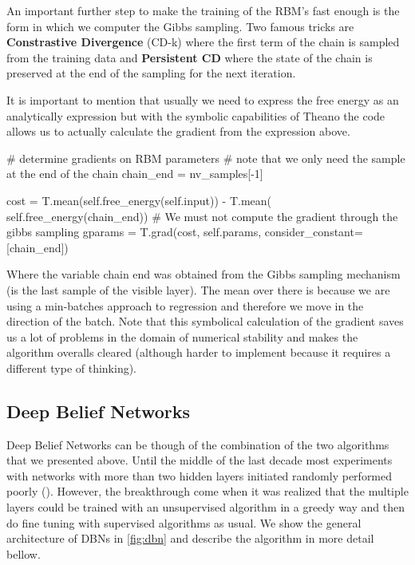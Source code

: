 \documentclass[11pt,a4paper]{article}
\begin{document}
An important further step to make the training of the RBM's fast enough is the form in which we computer the Gibbs sampling. Two famous tricks are \textbf{Constrastive Divergence} (CD-k) where the first term of the chain is sampled from the training data and \textbf{Persistent CD} where the state of the chain is preserved at the end of the sampling for the next iteration. 

It is important to mention that usually we need to express the free energy as an analytically expression but with the symbolic capabilities of Theano the code allows us to actually calculate the gradient from the expression above. 

\begin{python}
   # determine gradients on RBM parameters
        # note that we only need the sample at the end of the chain
        chain_end = nv_samples[-1]

        cost = T.mean(self.free_energy(self.input)) - T.mean(
            self.free_energy(chain_end))
        # We must not compute the gradient through the gibbs sampling
        gparams = T.grad(cost, self.params, consider_constant=[chain_end])
\end{python}

Where the variable chain end was obtained from the Gibbs sampling mechanism (is the last sample of the visible layer). The mean over there is because we are using a min-batches approach to regression and therefore we move in the direction of the batch. Note that this symbolical calculation of the gradient saves us a lot of problems in the domain of numerical stability and makes the algorithm overalls cleared (although harder to implement because it requires a different type of thinking).

\subsection{Deep Belief Networks}


Deep Belief Networks can be though of the combination of the two  algorithms that we presented above. Until the middle of the last decade most experiments with networks with more than two hidden layers initiated randomly performed poorly (\cite{bengio2009learning}). However, the breakthrough come when it was realized that the multiple layers could be trained with an unsupervised algorithm in a greedy way and then do fine tuning with supervised algorithms as usual. We show the general architecture of DBNs in \ref{fig:dbn} and describe the algorithm in more detail bellow. 
\end{document}
